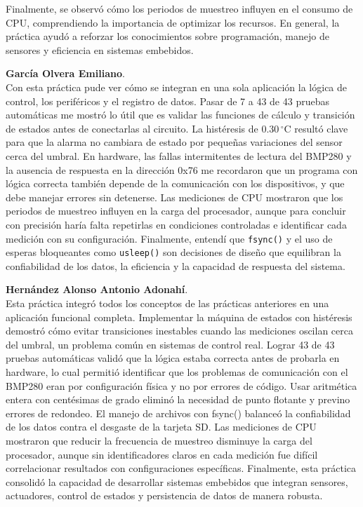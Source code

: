 \documentclass[conference]{IEEEtran}
\begin{document}
Finalmente, se observó cómo los periodos de muestreo influyen en el consumo de CPU, comprendiendo la importancia de optimizar los recursos. En general, la práctica ayudó a reforzar los conocimientos sobre programación, manejo de sensores y eficiencia en sistemas embebidos.

\vspace{0.35cm}

\textbf{García Olvera Emiliano}.\\
Con esta práctica pude ver cómo se integran en una sola aplicación la lógica de control, los periféricos y el registro de datos. Pasar de 7 a 43 de 43 pruebas automáticas me mostró lo útil que es validar las funciones de cálculo y transición de estados antes de conectarlas al circuito. La histéresis de 0.30\,$^{\circ}$C resultó clave para que la alarma no cambiara de estado por pequeñas variaciones del sensor cerca del umbral. En hardware, las fallas intermitentes de lectura del BMP280 y la ausencia de respuesta en la dirección 0x76 me recordaron que un programa con lógica correcta también depende de la comunicación con los dispositivos, y que debe manejar errores sin detenerse. Las mediciones de CPU mostraron que los periodos de muestreo influyen en la carga del procesador, aunque para concluir con precisión haría falta repetirlas en condiciones controladas e identificar cada medición con su configuración. Finalmente, entendí que \texttt{fsync()} y el uso de esperas bloqueantes como \texttt{usleep()} son decisiones de diseño que equilibran la confiabilidad de los datos, la eficiencia y la capacidad de respuesta del sistema.

\vspace{0.35cm}

\textbf{Hernández Alonso Antonio Adonahí}.\\
Esta práctica integró todos los conceptos de las prácticas anteriores en una aplicación funcional completa. Implementar la máquina de estados con histéresis demostró cómo evitar transiciones inestables cuando las mediciones oscilan cerca del umbral, un problema común en sistemas de control real. Lograr 43 de 43 pruebas automáticas validó que la lógica estaba correcta antes de probarla en hardware, lo cual permitió identificar que los problemas de comunicación con el BMP280 eran por configuración física y no por errores de código. Usar aritmética entera con centésimas de grado eliminó la necesidad de punto flotante y previno errores de redondeo. El manejo de archivos con fsync() balanceó la confiabilidad de los datos contra el desgaste de la tarjeta SD. Las mediciones de CPU mostraron que reducir la frecuencia de muestreo disminuye la carga del procesador, aunque sin identificadores claros en cada medición fue difícil correlacionar resultados con configuraciones específicas. Finalmente, esta práctica consolidó la capacidad de desarrollar sistemas embebidos que integran sensores, actuadores, control de estados y persistencia de datos de manera robusta.
\end{document}
